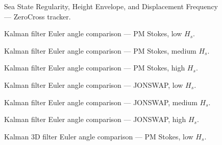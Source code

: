 \documentclass[11pt,letterpaper]{article}
\begin{document}
\begin{figure}[H]\centering
  \resizebox{\textwidth}{!}{}
  \caption{Sea State Regularity, Height Envelope, and Displacement Frequency — ZeroCross tracker.}
  \label{fig:seareg_zerocross}
\end{figure}


\begin{figure}[H]\centering
  \resizebox{\textwidth}{!}{}
  \caption{Kalman filter Euler angle comparison — PM Stokes, low $H_s$.}
  \label{fig:qmekf_pmstokes_low}
\end{figure}

\begin{figure}[H]\centering
  \resizebox{\textwidth}{!}{}
  \caption{Kalman filter Euler angle comparison — PM Stokes, medium $H_s$.}
  \label{fig:qmekf_pmstokes_medium}
\end{figure}

\begin{figure}[H]\centering
  \resizebox{\textwidth}{!}{}
  \caption{Kalman filter Euler angle comparison — PM Stokes, high $H_s$.}
  \label{fig:qmekf_pmstokes_high}
\end{figure}

\begin{figure}[H]\centering
  \resizebox{\textwidth}{!}{}
  \caption{Kalman filter Euler angle comparison — JONSWAP, low $H_s$.}
  \label{fig:qmekf_jonswap_low}
\end{figure}

\begin{figure}[H]\centering
  \resizebox{\textwidth}{!}{}
  \caption{Kalman filter Euler angle comparison — JONSWAP, medium $H_s$.}
  \label{fig:qmekf_jonswap_medium}
\end{figure}

\begin{figure}[H]\centering
  \resizebox{\textwidth}{!}{}
  \caption{Kalman filter Euler angle comparison — JONSWAP, high $H_s$.}
  \label{fig:qmekf_jonswap_high}
\end{figure}


\begin{figure}[H]\centering
  \resizebox{\textwidth}{!}{}
  \caption{Kalman 3D filter Euler angle comparison — PM Stokes, low $H_s$.}
  \label{fig:w3d_pmstokes_low}
\end{figure}
\end{document}
